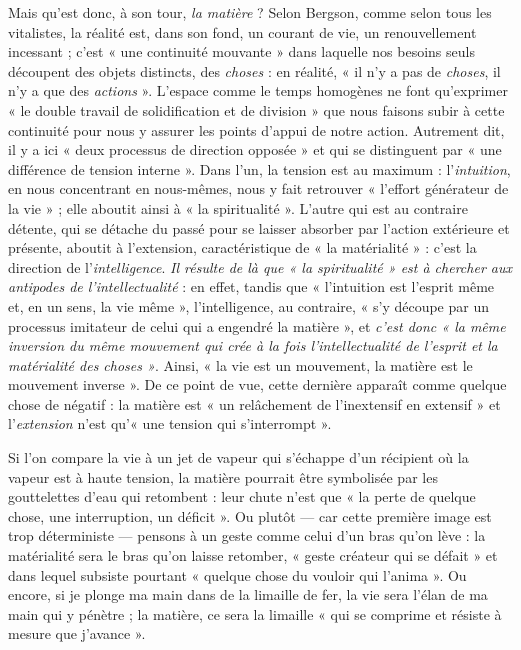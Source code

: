Mais qu'est donc, à son tour, {\it la matière} ? Selon Bergson, comme
selon tous les vitalistes, la réalité est, dans son fond, un courant de
vie, un renouvellement incessant ; c’est « une continuité mouvante »
dans laquelle nos besoins seuls découpent des objets distincts, des
{\it choses} : en réalité, « il n’y a pas de {\it choses}, il n'y a que des {\it actions} ».
L'espace comme le temps homogènes ne font qu’exprimer « le double
travail de solidification et de division » que nous faisons subir à cette
continuité pour nous y assurer les points d'appui de notre action.
Autrement dit, il y a ici « deux processus de direction opposée » et
qui se distinguent par « une différence de tension interne ». Dans
l'un, la tension est au maximum : l'{\it intuition}, en nous concentrant en
nous-mêmes, nous y fait retrouver « l’effort générateur de la vie » ; elle
aboutit ainsi à « la spiritualité ». L'autre qui est au contraire détente,
qui se détache du passé pour se laisser absorber par l'action extérieure
et présente, aboutit à l'extension, caractéristique de « la
matérialité » : c’est la direction de l'{\it intelligence}. {\it Il résulte de là que
« la spiritualité » est à chercher aux antipodes de l'intellectualité} : en
effet, tandis que « l'intuition est l'esprit même et, en un sens, la vie
même », l'intelligence, au contraire, « s’y découpe par un processus
imitateur de celui qui a engendré la matière », et {\it c’est donc « la même
inversion du même mouvement qui crée à la fois l'intellectualité de
l'esprit et la matérialité des choses »}. Ainsi, « la vie est un mouvement,
la matière est le mouvement inverse ». De ce point de vue, cette
dernière apparaît comme quelque chose de négatif : la matière est
« un relâchement de l’inextensif en extensif » et l'{\it extension} n'est
qu’« une tension qui s’interrompt ».

\vspace{0.24cm}
{\footnotesize Si l’on compare la vie à un jet de vapeur qui s'échappe d'un récipient
où la vapeur est à haute tension, la matière pourrait être symbolisée par
les gouttelettes d’eau qui retombent : leur chute n'est que « la perte de
quelque chose, une interruption, un déficit ». Ou plutôt — car cette première
image est trop déterministe — pensons à un geste comme celui d'un bras
qu'on lève : la matérialité sera le bras qu'on laisse retomber, « geste créateur
qui se défait » et dans lequel subsiste pourtant « quelque chose du vouloir
qui l’anima ». Ou encore, si je plonge ma main dans de la limaille de fer,
la vie sera l’élan de ma main qui y pénètre ; la matière, ce sera la limaille
« qui se comprime et résiste à mesure que j'avance ».}
\vspace{0.31cm}

